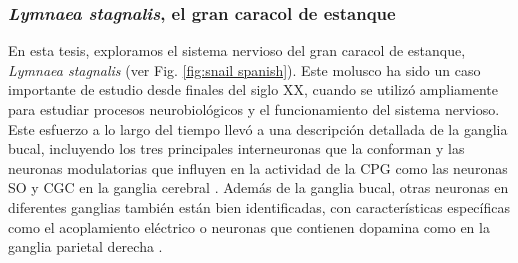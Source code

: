 \subsubsection{\textit{Lymnaea stagnalis}, el gran caracol de estanque}
En esta tesis, exploramos el sistema nervioso del gran caracol de estanque, \textit{Lymnaea stagnalis} (ver Fig. \ref{fig:snail spanish}). Este molusco ha sido un caso importante de estudio desde finales del siglo XX, cuando se utilizó ampliamente para estudiar procesos neurobiológicos y el funcionamiento del sistema nervioso. Este esfuerzo a lo largo del tiempo llevó a una descripción detallada de la ganglia bucal, incluyendo los tres principales interneuronas que la conforman \parencite{benjamin_snail_1989,benjamin_morphology_1979,rose_relationship_1979,brierley_behavioral_1997} y las neuronas modulatorias que influyen en la actividad de la CPG como las neuronas SO y CGC en la ganglia cerebral \parencite{rose_interneuronal_1981,mccrohan_patterns_1980,kemenes_multiple_2001}. Además de la ganglia bucal, otras neuronas en diferentes ganglias también están bien identificadas, con características específicas como el acoplamiento eléctrico o neuronas que contienen dopamina como en la ganglia parietal derecha \parencite{benjamin_electrotonic_1986,winlow_multiple_1981}.


